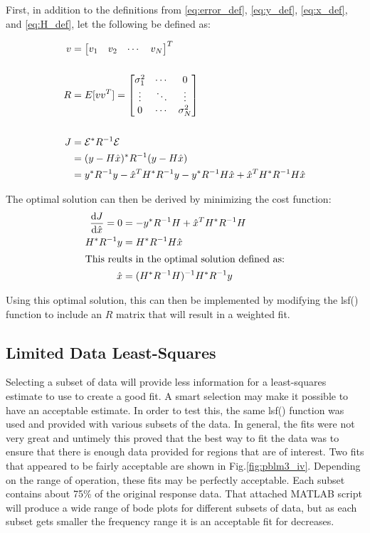 \documentclass[]{article}
\renewcommand{\figurename}{Fig.}
\newcommand{\Epsilon}{\mathcal{E}}
\begin{document}
		First, in addition to the definitions from \eqref{eq:error_def}, \eqref{eq:y_def}, \eqref{eq:x_def}, and \eqref{eq:H_def}, let the following be defined as:
		
		\begin{align}
			v &= \mqty[v_1	&v_2	&\cdots	&v_N]^T\\ \nonumber\\
			R &= E[v v^T] = \mqty[	\sigma_1^2	&\cdots	&0\\
									\vdots		&\ddots	&\vdots\\
									0			&\cdots	&\sigma_N^2
									]\\ \nonumber \\
			J &= \Epsilon^* R^{-1} \Epsilon\\
			  &= (y - H\hat{x})^* R^{-1} (y - H\hat{x})\nonumber\\
			  &= y^*R^{-1}y - \hat{x}^T H^* R^{-1} y - y^* R^{-1} H \hat{x} + \hat{x}^T H^* R^{-1} H \hat{x}\nonumber
		\end{align}
		
		The optimal solution can then be derived by minimizing the cost function:
		\begin{align}
			\dv{J}{\hat{x}} = 0 &= -y^* R^{-1} H + \hat{x}^T H^* R^{-1} H\\
			H^* R^{-1} y &= H^* R^{-1} H \hat{x} \nonumber\\
		\intertext{This reults in the optimal solution defined as:}
			\hat{x} &= (H^* R^{-1} H)^{-1} H^* R^{-1} y
		\end{align}
	
		Using this optimal solution, this can then be implemented by modifying the lsf() function to include an $R$ matrix that will result in a weighted fit.
	
	\subsection{Limited Data Least-Squares}
		Selecting a subset of data will provide less information for a least-squares estimate to use to create a good fit. A smart selection may make it possible to have an acceptable estimate. In order to test this, the same lsf() function was used and provided with various subsets of the data. In general, the fits were not very great and untimely this proved that the best way to fit the data was to ensure that there is enough data provided for regions that are of interest. Two fits that appeared to be fairly acceptable are shown in \figurename \ref{fig:pblm3_iv}. Depending on the range of operation, these fits may be perfectly acceptable. Each subset contains about 75\% of the original response data. That attached MATLAB script will produce a wide range of bode plots for different subsets of data, but as each subset gets smaller the frequency range it is an acceptable fit for decreases.
		
\end{document}
